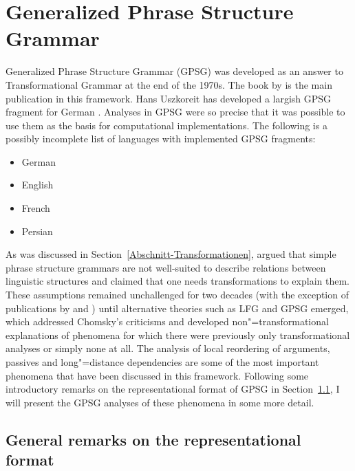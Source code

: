 
\chapter{Generalized Phrase Structure Grammar}
\label{Kapitel-GPSG}\label{chap-gpsg}

Generalized Phrase Structure Grammar (GPSG) was developed as an answer %
to Transformational Grammar at the end of the 1970s. The book by \citet*{GKPS85a} is the main publication in
this framework. Hans Uszkoreit has developed a largish GPSG fragment for German \citeyearpar{Uszkoreit87a}.
Analyses in GPSG were so precise that it was possible to use them as the basis for computational implementations.
The following is a possibly incomplete list of languages with implemented GPSG fragments:
\begin{itemize}
\item German \citep{Weisweber87a-u,WP92b,Naumann87a-u,Naumann88-u-gekauft,Volk88}
\item English \citep*{Evans85a-u,PT85a-u,Phillips92a-u,GCB93a-u}
\item French \citep*{EdSB96a}
\item Persian \citep*{BSM2011a}
\end{itemize}

As was discussed in Section~\ref{Abschnitt-Transformationen}, \citet{Chomsky57a} argued that simple phrase structure
grammars are not well-suited to describe relations between linguistic structures and claimed that one needs transformations to
explain them. These assumptions remained unchallenged for two decades (with the exception of publications by 
and ) until alternative theories such as LFG and GPSG emerged, which addressed Chomsky's criticisms and developed non"=transformational explanations of phenomena for which there were previously only transformational analyses
or simply none at all. The analysis of local reordering of arguments, passives and long"=distance dependencies are some of the most important phenomena
that have been discussed in this framework. Following some introductory remarks on the representational format of GPSG in Section~\ref{sec-Representationsformat}, I will
present the GPSG analyses of these phenomena in some more detail.

\section{General remarks on the representational format}
\label{sec-Representationsformat}

